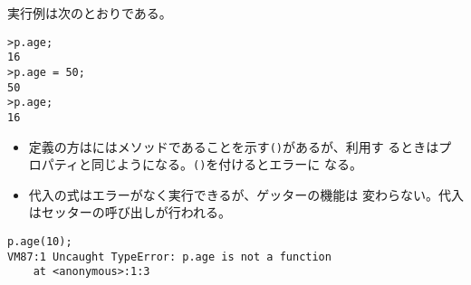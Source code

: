  実行例は次のとおりである。
\begin{Verbatim}
>p.age;
16
>p.age = 50;
50
>p.age;
16
\end{Verbatim}
\begin{itemize}
 \item 定義の方はにはメソッドであることを示す\texttt{()}があるが、利用す
       るときはプロパティと同じようになる。\texttt{()}を付けるとエラーに
       なる。
 \item 代入の式はエラーがなく実行できるが、ゲッターの機能は
       変わらない。代入はセッターの呼び出しが行われる。
\end{itemize}
\begin{Verbatim}
p.age(10);
VM87:1 Uncaught TypeError: p.age is not a function
    at <anonymous>:1:3
\end{Verbatim}



